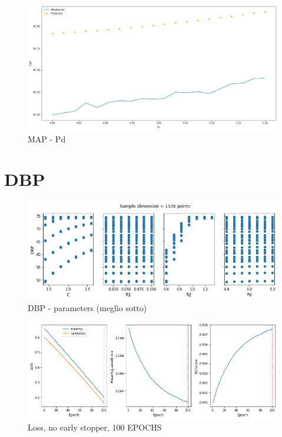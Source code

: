 \newpage


\begin{figure}[h]
    \centering
    \includegraphics[width=1\textwidth]{images/Training - temp/MAP - Pd.png}
    \caption{MAP - Pd}
\end{figure}

\newpage
\section{DBP}

\begin{figure}[h]
    \centering
    \includegraphics[width=1\textwidth]{images/Training - temp/DBP - parameters.png}
    \caption{DBP - parameters (meglio sotto)}
\end{figure}

\newpage


\begin{figure}[h]
    \centering
    \includegraphics[width=1\textwidth]{images/Training - temp/DBP - loss.png}
    \caption{Loss, no early stopper, 100 EPOCHS}
\end{figure}


